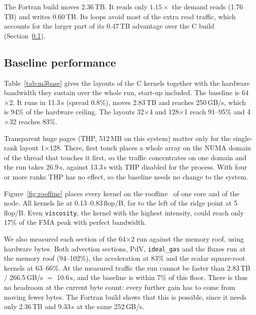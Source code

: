 \documentclass[a4paper,11pt]{article}
\newcommand{\kernel}[1]{\texttt{#1}}
\newcommand{\GBs}{\,GB/s}
\begin{document}
The Fortran build moves 2.36\,TB. It reads only $1.15\times$ the demand reads (1.76\,TB) and writes
0.60\,TB. Its loops avoid most of the extra read traffic, which accounts for the larger part of its 0.47\,TB
advantage over the C build (Section~\ref{sec:perf}).

\subsection{Baseline performance}
\label{sec:perf}
Table~\ref{tab:m3base} gives the layouts of the C kernels together with the hardware bandwidth they sustain
over the whole run, start-up included. The baseline is 64$\times$2. It runs in 11.3\,s (spread 0.8\%), moves
2.83\,TB and reaches 250\GBs{}, which is 94\% of the hardware ceiling. The layouts 32$\times$4 and
128$\times$1 reach 91--95\% and 4$\times$32 reaches 83\%.

Transparent huge pages (THP, 512\,MB on this system) matter only for the single-rank layout 1$\times$128.
There, first touch places a whole array on the NUMA domain of the thread that touches it first, so the
traffic concentrates on one domain and the run takes 26.9\,s, against 13.3\,s with THP disabled for the
process. With four or more ranks THP has no effect, so the baseline needs no change to the system.

\begin{table}[htbp]
  \centering\small
  
  \caption{Baseline layouts, bm3840: median of 5 (min--max), hardware bytes of the DDR-controller
    counters, the resulting bandwidth and its share of the 266.5\GBs{} ceiling and the load of the busiest
    controller group relative to the mean. THP as installed except for the one marked row.}
  \label{tab:m3base}
\end{table}

Figure~\ref{fig:roofline} places every kernel on the roofline~\cite{williams2009} of one core and of the node. All kernels lie at
0.13--0.83\,flop/B, far to the left of the ridge point at 5\,flop/B. Even \kernel{viscosity}, the kernel with
the highest intensity, could reach only 17\% of the FMA peak with perfect bandwidth.

We also measured each section of the 64$\times$2 run against the memory roof, using hardware bytes. Both
advection sections, PdV, \kernel{ideal\_gas} and the fluxes run at the memory roof (94--102\%), the
acceleration at 83\% and the scalar square-root kernels at 63--66\%. At the measured traffic the run cannot
be faster than 2.83\,TB $/$ 266.5\GBs{} $=$ 10.6\,s, and the baseline is within 7\% of this floor. There is
thus no headroom at the current byte count: every further gain has to come from moving fewer bytes. The
Fortran build shows that this is possible, since it needs only 2.36\,TB and 9.33\,s at the same 252\GBs{}.
\end{document}
